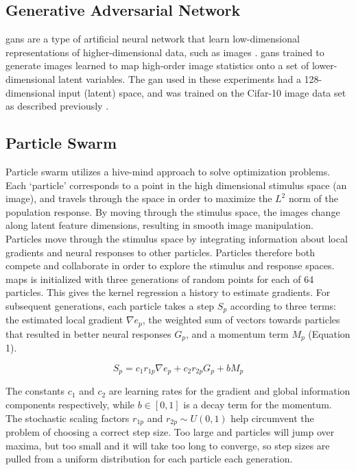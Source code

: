 \subsection*{Generative Adversarial Network}
\label{methods:gan}
\Glspl{gan} are a type of artificial neural network that learn low-dimensional representations of higher-dimensional data, such as images \cite{Karras2019}. \glspl{gan} trained to generate images learned to map high-order image statistics onto a set of lower-dimensional latent variables. The \gls{gan} used in these experiments had a 128-dimensional input (latent) space, and was trained on the Cifar-10 image data set as described previously \cite{Fruend2018}. 

\subsection{Particle Swarm}
Particle swarm utilizes a hive-mind approach to solve optimization problems. Each `particle’ corresponds to a point in the high dimensional stimulus space (an image), and travels through the space in order to maximize the $L^2$ norm of the population response. By moving through the stimulus space, the images change along latent feature dimensions, resulting in smooth image manipulation. Particles move through the stimulus space by integrating information about local gradients and neural responses to other particles. Particles therefore both compete and collaborate in order to explore the stimulus and response spaces. \\
\gls{maps} is initialized with three generations of random points for each of 64 particles. This gives the kernel regression a history to estimate gradients. For subsequent generations, each particle takes a step $S_p$ according to three terms: the estimated local gradient $\nabla e_p$,  the weighted sum of vectors towards particles that resulted in better neural responses $G_p$, and a momentum term $M_p$ (Equation 1).

\begin{equation}
	S_p= c_1 r_{1p} \nabla e_p+ c_2  r_{2p} G_p+b M_p
\end{equation}

The constants $c_1$ and $c_2$ are learning rates for the gradient and global information components respectively, while $b \in [0,1]$ is a decay term for the momentum. The stochastic scaling factors $r_{1p}$ and $r_{2p} \sim U(0,1)$ help circumvent the problem of choosing a correct step size. Too large and particles will jump over maxima, but too small and it will take too long to converge, so step sizes are pulled from a uniform distribution for each particle each generation.

